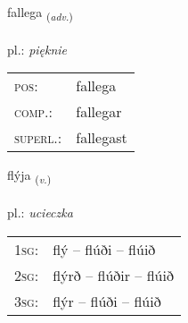 \documentclass[frontgrid, backgrid]{flacards}\usepackage[]{graphicx}\usepackage[]{xcolor}
\begin{document}
\renewcommand{\flhead}{\vskip5pt \fboxsep=0pt {\small\bfseries\footnotesize Atviksorð | przysłówek}}
\renewcommand{\fcfoot}{\vskip5pt \fboxsep=0pt \hspace{2pt}{\small\bfseries\footnotesize 3K}}

\renewcommand{\blhead}{\vskip5pt {\small\bfseries\footnotesize Atviksorð | przysłówek }}
\renewcommand{\bcfoot}{\vskip5pt \hspace{2pt}{\small\bfseries\footnotesize 3K}}


{fallega \small{\textsubscript{(\textit{adv.})}} \\[1ex] %
\textphonetic{[fatlɛɣa]} \\
pl.: \emph{pięknie} \\  [2ex]
\renewcommand*{\arraystretch}{0.8}
\begin{tabular}{ll}
\textsc{pos}: & fallega \\ 
\textsc{comp.}: & fallegar \\ 
\textsc{superl.}: & fallegast \\
\end{tabular}
}

\renewcommand{\flhead}{\vskip5pt \fboxsep=0pt {\small\bfseries\footnotesize Sagnorð | czasownik}}
\renewcommand{\fcfoot}{\vskip5pt \fboxsep=0pt \hspace{2pt}{\small\bfseries\footnotesize 3K}}

\renewcommand{\blhead}{\vskip5pt {\small\bfseries\footnotesize Sagnorð | czasownik }}
\renewcommand{\bcfoot}{\vskip5pt \hspace{2pt}{\small\bfseries\footnotesize 3K}}


{flýja \small{\textsubscript{(\textit{v.})}} \\[1ex] %
\textphonetic{[fliːja]} \\
pl.: \emph{ucieczka} \\  [2ex]
\renewcommand*{\arraystretch}{0.8}
\begin{tabular}{p{1cm}l}
\textsc{1sg}: & flý -- flúði -- flúið \\ 
\textsc{2sg}: & flýrð -- flúðir -- flúið \\ 
\textsc{3sg}: & flýr -- flúði -- flúið \\ 
\end{tabular}
}
\end{document}

